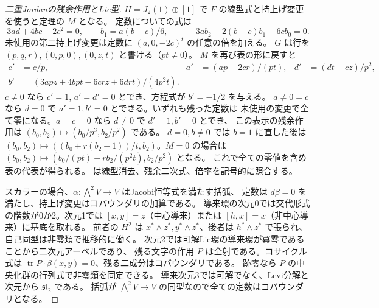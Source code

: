 \begin{proof}[二重Jordanの残余作用とLie型]
$H=J_2(1)\oplus[1]$ で $F$ の線型式と持上げ変更を使うと定理の $M$ となる。
定数についての式は
\[
 3ad+4bc+2c^2=0,\qquad b_1=a(b-c)/6,\qquad
 -3a b_2+2(b-c)b_1-6c b_0=0 .
\]
未使用の第二持上げ変更は定数に $(a,0,-2c)^t$ の任意の倍を加える。
$G$ は行を $(p,q,r),(0,p,0),(0,z,t)$ と書ける（$pt\ne0$）。
$M$ を再び表の形に戻すと
\begin{align*}
 c'&=c/p,& a'&=(ap-2cr)/(pt),& d'&=(dt-cz)/p^2,\\
 b'&=(3apz+4bpt-6crz+6drt)/(4p^2t).
\end{align*}
$c\ne0$ なら $c'=1$, $a'=d'=0$ とでき、方程式が $b'=-1/2$ を与える。
$a\ne0=c$ なら $d=0$ で $a'=1,b'=0$ とできる。いずれも残った定数は
未使用の変更で全て零になる。$a=c=0$ なら $d\ne0$ で $d'=1,b'=0$ とでき、
この表示の残余作用は $(b_0,b_2)\mapsto (b_0/p^3,b_2/p^2)$ である。
$d=0,b\ne0$ では $b=1$ に直した後は $(b_0,b_2)\mapsto
((b_0+r(b_2-1))/t,b_2)$。$M=0$ の場合は
$(b_0,b_2)\mapsto(b_0/(pt)+r b_2/(p^2 t),b_2/p^2)$ となる。
これで全ての零値を含め表の代表が得られる。
 は線型消去、残余二次式、倍率を記号的に照合する。

スカラーの場合、$\alpha:\bigwedge^2 V\to V$ はJacobi恒等式を満たす括弧、
定数は $d\beta=0$ を満たし、持上げ変更はコバウンダリの加算である。
導来環の次元0では交代形式の階数が0か2。次元1では
$[x,y]=z$（中心導来）または $[h,x]=x$（非中心導来）に基底を取れる。
前者の $H^2$ は $x^*\wedge z^*,y^*\wedge z^*$、後者は
$h^*\wedge z^*$ で張られ、自己同型は非零類で推移的に働く。
次元2では可解Lie環の導来環が冪零であることから二次元アーベルであり、
残る文字の作用 $P$ は全射である。コサイクル式は
$\operatorname{tr}P\cdot\beta(x,y)=0$、残る二成分はコバウンダリである。
跡零なら $P$ の中央化群の行列式で非零類を同定できる。
導来次元3では可解でなく、Levi分解と次元から $\mathfrak{sl}_2$ である。
括弧が $\bigwedge^2V\to V$ の同型なので全ての定数はコバウンダリとなる。
\end{proof}

